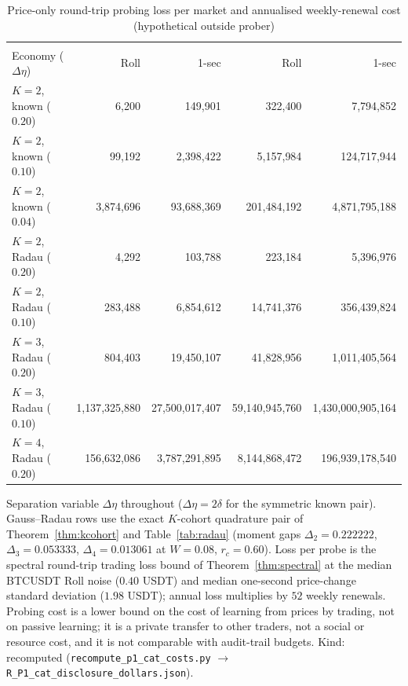 \begin{table}[t]\centering\footnotesize
\begin{threeparttable}
\caption{Price-only round-trip probing loss per market and annualised weekly-renewal cost (hypothetical outside prober)}\label{tab:cat_dollars}
\setlength{\tabcolsep}{1.5pt}
\begin{tabular}{@{}>{\scriptsize}l*{4}{>{\scriptsize}r}@{}}
\toprule
 & \multicolumn{2}{c}{\scriptsize Loss / probe (USDT)} & \multicolumn{2}{c}{\scriptsize Annual ($52\times$, USDT)}\\
Economy ($\Delta\eta$) & Roll & 1-sec & Roll & 1-sec\\
\midrule
$K=2$, known ($0.20$) & 6{,}200 & 149{,}901 & 322{,}400 & 7{,}794{,}852\\
$K=2$, known ($0.10$) & 99{,}192 & 2{,}398{,}422 & 5{,}157{,}984 & 124{,}717{,}944\\
$K=2$, known ($0.04$) & 3{,}874{,}696 & 93{,}688{,}369 & 201{,}484{,}192 & 4{,}871{,}795{,}188\\
\midrule
$K=2$, Radau ($0.20$) & 4{,}292 & 103{,}788 & 223{,}184 & 5{,}396{,}976\\
$K=2$, Radau ($0.10$) & 283{,}488 & 6{,}854{,}612 & 14{,}741{,}376 & 356{,}439{,}824\\
$K=3$, Radau ($0.20$) & 804{,}403 & 19{,}450{,}107 & 41{,}828{,}956 & 1{,}011{,}405{,}564\\
$K=3$, Radau ($0.10$) & 1{,}137{,}325{,}880 & 27{,}500{,}017{,}407 & 59{,}140{,}945{,}760 & 1{,}430{,}000{,}905{,}164\\
$K=4$, Radau ($0.20$) & 156{,}632{,}086 & 3{,}787{,}291{,}895 & 8{,}144{,}868{,}472 & 196{,}939{,}178{,}540\\
\bottomrule
\end{tabular}
\begin{tablenotes}\footnotesize\item Separation variable $\Delta\eta$ throughout ($\Delta\eta=2\delta$ for the symmetric known pair). Gauss--Radau rows use the exact $K$-cohort quadrature pair of Theorem~\ref{thm:kcohort} and Table~\ref{tab:radau} (moment gaps $\Delta_2=0.222222$, $\Delta_3=0.053333$, $\Delta_4=0.013061$ at $W=0.08$, $r_c=0.60$). Loss per probe is the spectral round-trip trading loss bound of Theorem~\ref{thm:spectral} at the median BTCUSDT Roll noise ($0.40$ USDT) and median one-second price-change standard deviation ($1.98$ USDT); annual loss multiplies by $52$ weekly renewals. Probing cost is a lower bound on the cost of learning from prices by trading, not on passive learning; it is a private transfer to other traders, not a social or resource cost, and it is not comparable with audit-trail budgets. Kind: recomputed (\texttt{recompute\_p1\_cat\_costs.py} $\to$ \texttt{R\_P1\_cat\_disclosure\_dollars.json}).\end{tablenotes}
\end{threeparttable}
\end{table}

